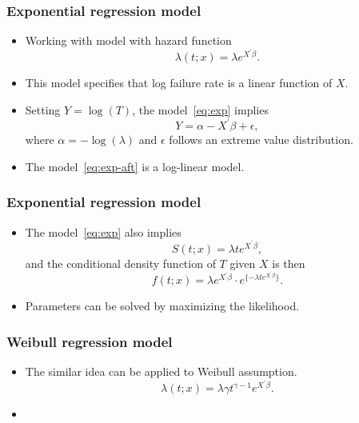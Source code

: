 \documentclass[10pt]{beamer}\usepackage[]{graphicx}\usepackage[]{color}
\begin{document}
\begin{frame}
  \frametitle{Exponential regression model}
  \begin{itemize}
  \item Working with model with hazard function
    \begin{equation}
      \lambda(t; x) = \lambda e^{X^\prime\beta}.
      \label{eq:exp}
    \end{equation}
  \item This model specifies that log failure rate is a linear function of $X$.
  \item Setting $Y = \log(T)$, the model~\eqref{eq:exp} implies
    \begin{equation}
      \label{eq:exp-aft}
      Y = \alpha - X^\prime\beta + \epsilon,
    \end{equation}
    where $\alpha = -\log(\lambda)$ and $\epsilon$ follows an extreme value distribution.
  \item The model~\eqref{eq:exp-aft} is a log-linear model.
  \end{itemize}
\end{frame}

\begin{frame}
  \frametitle{Exponential regression model}
  \begin{itemize}
  \item The model~\eqref{eq:exp} also implies
    $$S(t;x) = \lambda t e^{X^\prime\beta},$$
    and the conditional density function of $T$ given $X$ is then
    $$f(t;x) = \lambda e^{X^\prime\beta}\cdot e^{\{- \lambda t e^{X^\prime\beta}\}}.$$
  \item Parameters can be solved by maximizing the likelihood.
  \end{itemize}
\end{frame}

\begin{frame}
  \frametitle{Weibull regression model}
  \begin{itemize}
  \item The similar idea can be applied to Weibull assumption. 
    $$\lambda(t; x) = \lambda\gamma t^{\gamma-1}e^{X^\prime\beta}.$$
  \item 
  \end{itemize}
\end{frame}
\end{document}
